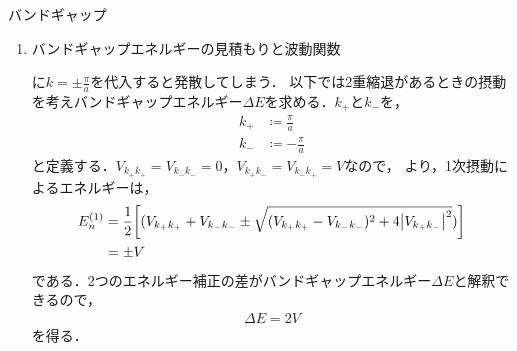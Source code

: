 \documentclass{report}
\begin{document}
\begin{myex}{バンドギャップ}{}
\begin{enumerate}
\begin{enumerate}
\begin{align}
\begin{dcases}
              \epsilon(k_1) < \epsilon^{(0)}(k_1 - g)
            \end{dcases}
          \end{align}
          が成りたつ．よって，$E(k) < \epsilon^{(0)}(k)$が成り立ち，摂動が加わった後のエネルギーは加わる前のエネルギーより小さくなる．
          \item 第1 Brillouinゾーン外側$\qty(k = k_2 > \frac{\pi}{a})$の振る舞い\par
            第1 Brillouinゾーン内側のときと同様に考えると，
            \begin{align}
              \begin{dcases}
                \epsilon(k_2) \ll \epsilon^{(0)}(k_2 + g)\\
                \epsilon(k_2) > \epsilon^{(0)}(k_2 - g)
              \end{dcases}
            \end{align}
            を得る．よって，$E(k) > \epsilon^{(0)}(k)$が成り立ち，摂動が加わった後のエネルギーは加わる前のエネルギーより大きくなる．
          \end{enumerate}
          以上の議論により，結晶中の周期ポテンシャルによりバンドギャップが形成されることがわかった．
      \item バンドギャップエネルギーの見積もりと波動関数\par
        に$k = \pm\frac{\pi}{a}$を代入すると発散してしまう．
        以下では2重縮退があるときの摂動を考えバンドギャップエネルギー$\Delta E$を求める．$k_+$と$k_-$を，
        \begin{align}
          k_+ &\coloneqq \frac{\pi}{a} \\ 
          k_- &\coloneqq -\frac{\pi}{a}
        \end{align}
        と定義する．$V_{k_+k_+} = V_{k_-k_-} = 0$，$V_{k_+k_-} = V_{k_-k_+} = V$なので，
        より，1次摂動によるエネルギーは，
        \begin{align}
          E_n^{(1)} &= \frac{1}{2}\qty[(V_{k_+k_+} + V_{k_-k_-}\pm\sqrt{(V_{k_+k_+} - V_{k_-k_-})^2 + 4\abs{V_{k_+k_-}}^2})] \\ 
          &= \pm V
        \end{align}
        である．2つのエネルギー補正の差がバンドギャップエネルギー$\Delta E$と解釈できるので，
        \begin{align}
          \Delta E = 2V
        \end{align}
        を得る．\par

\end{enumerate}
\end{myex}
\end{document}
